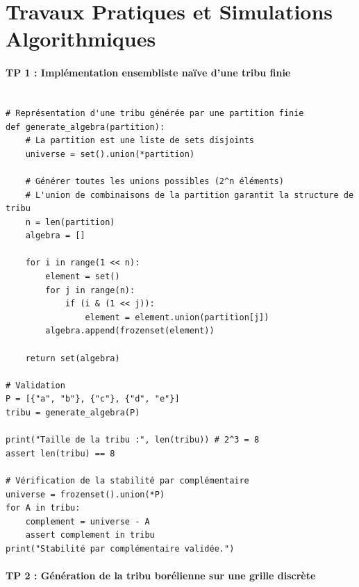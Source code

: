\documentclass[11pt,a4paper]{article}
\begin{document}
\part{Travaux Pratiques et Simulations Algorithmiques}
\subsection*{TP 1 : Implémentation ensembliste naïve d'une tribu finie}

\begin{lstlisting}

# Représentation d'une tribu générée par une partition finie
def generate_algebra(partition):
    # La partition est une liste de sets disjoints
    universe = set().union(*partition)

    # Générer toutes les unions possibles (2^n éléments)
    # L'union de combinaisons de la partition garantit la structure de tribu
    n = len(partition)
    algebra = []

    for i in range(1 << n):
        element = set()
        for j in range(n):
            if (i & (1 << j)):
                element = element.union(partition[j])
        algebra.append(frozenset(element))

    return set(algebra)

# Validation
P = [{"a", "b"}, {"c"}, {"d", "e"}]
tribu = generate_algebra(P)

print("Taille de la tribu :", len(tribu)) # 2^3 = 8
assert len(tribu) == 8

# Vérification de la stabilité par complémentaire
universe = frozenset().union(*P)
for A in tribu:
    complement = universe - A
    assert complement in tribu
print("Stabilité par complémentaire validée.")

\end{lstlisting}


\subsection*{TP 2 : Génération de la tribu borélienne sur une grille discrète}
\end{document}
